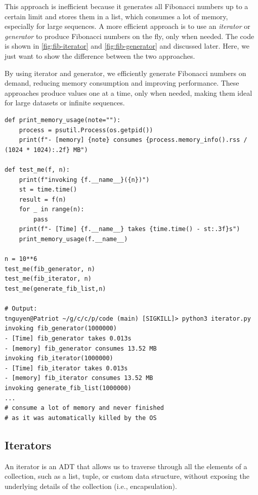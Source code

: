 \documentclass[oneside,11pt,dvipsnames]{book}
\begin{document}
This approach is inefficient because it generates all Fibonacci numbers up to a certain limit and stores them in a list, which consumes a lot of memory, especially for large sequences. 
A more efficient approach is to use an \emph{iterator} or \emph{generator} to produce Fibonacci numbers on the fly, only when needed. The code is shown in \autoref{fig:fib-iterator} and \autoref{fig:fib-generator} and discussed later. Here, we just want to show the difference between the two approaches.  


By using iterator and generator, we efficiently generate Fibonacci numbers on demand, reducing memory consumption and improving performance. These approaches produce values one at a time, only when needed, making them ideal for large datasets or infinite sequences.

\begin{lstlisting}
def print_memory_usage(note=""):
    process = psutil.Process(os.getpid())
    print(f"- [memory] {note} consumes {process.memory_info().rss / (1024 * 1024):.2f} MB")
    
def test_me(f, n):
    print(f"invoking {f.__name__}({n})")
    st = time.time()
    result = f(n)
    for _ in range(n):
        pass
    print(f"- [Time] {f.__name__} takes {time.time() - st:.3f}s")
    print_memory_usage(f.__name__)

n = 10**6
test_me(fib_generator, n)
test_me(fib_iterator, n)
test_me(generate_fib_list,n)

# Output:
tnguyen@Patriot ~/g/c/c/p/code (main) [SIGKILL]> python3 iterator.py
invoking fib_generator(1000000)
- [Time] fib_generator takes 0.013s
- [memory] fib_generator consumes 13.52 MB
invoking fib_iterator(1000000)
- [Time] fib_iterator takes 0.013s
- [memory] fib_iterator consumes 13.52 MB
invoking generate_fib_list(1000000) 
...
# consume a lot of memory and never finished 
# as it was automatically killed by the OS

\end{lstlisting}    



\subsection{Iterators}\label{sec:iterators}

An iterator is an ADT that allows us to traverse through all the elements of a collection, such as a list, tuple, or custom data structure, without exposing the underlying details of the collection (i.e., encapsulation). 
\end{document}
